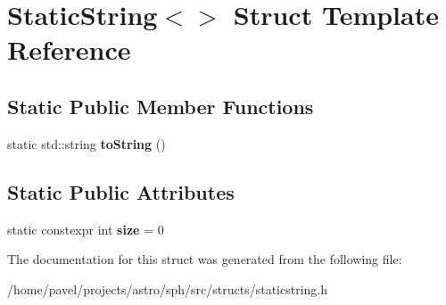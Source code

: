 \hypertarget{structStaticString_3_4}{}\section{Static\+String$<$$>$ Struct Template Reference}
\label{structStaticString_3_4}
\subsection*{Static Public Member Functions}
\begin{DoxyCompactItemize}
\item 
\hypertarget{structStaticString_3_4_ad7d84f73f35bff53b913031667fcd557}{}\label{structStaticString_3_4_ad7d84f73f35bff53b913031667fcd557} 
static std\+::string {\bfseries to\+String} ()
\end{DoxyCompactItemize}
\subsection*{Static Public Attributes}
\begin{DoxyCompactItemize}
\item 
\hypertarget{structStaticString_3_4_a00fb43bd17fb6a9254c5a279ca050170}{}\label{structStaticString_3_4_a00fb43bd17fb6a9254c5a279ca050170} 
static constexpr int {\bfseries size} = 0
\end{DoxyCompactItemize}


The documentation for this struct was generated from the following file\+:\begin{DoxyCompactItemize}
\item 
/home/pavel/projects/astro/sph/src/structs/staticstring.\+h\end{DoxyCompactItemize}
